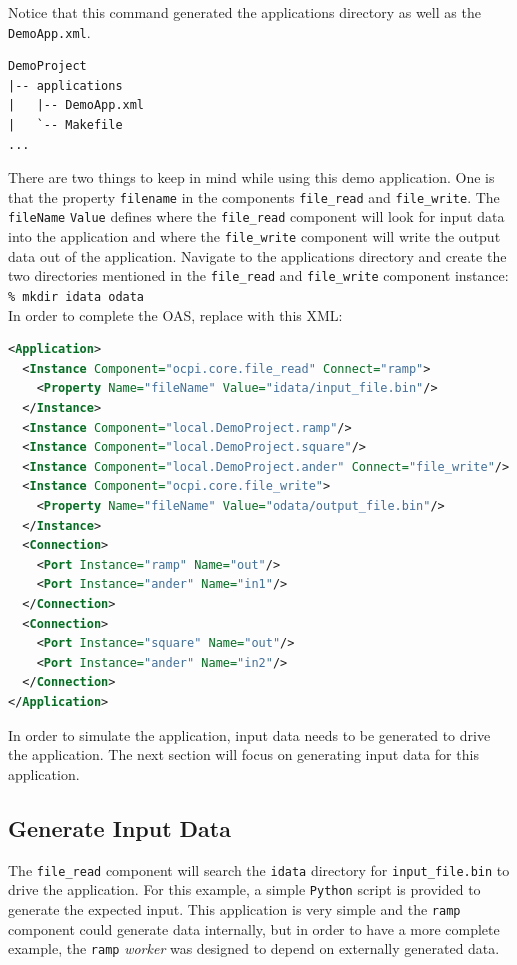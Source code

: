 Notice that this command generated the applications directory as well as the \verb+DemoApp.xml+.

\begin{verbatim}
DemoProject
|-- applications
|   |-- DemoApp.xml
|   `-- Makefile
...
\end{verbatim}

There are two things to keep in mind while using this demo application. One is that the property \verb+filename+ in the components \verb+file_read+ and \verb+file_write+. The \verb+fileName+ \verb+Value+ defines where the \verb+file_read+ component will look for input data into the application and where the \verb+file_write+ component will write the output data out of the application. \newline
\bstart
Navigate to the applications directory and create the two directories mentioned in the \verb+file_read+ and \verb+file_write+ component instance:\\

\forceindent\verb+% mkdir idata odata+\\
\bend
\bstart
\label{example:application}
In order to complete the OAS, replace  with this XML:
\begin{lstlisting}[language=xml]
<Application>
  <Instance Component="ocpi.core.file_read" Connect="ramp">
    <Property Name="fileName" Value="idata/input_file.bin"/>
  </Instance>
  <Instance Component="local.DemoProject.ramp"/>
  <Instance Component="local.DemoProject.square"/>
  <Instance Component="local.DemoProject.ander" Connect="file_write"/>
  <Instance Component="ocpi.core.file_write">
    <Property Name="fileName" Value="odata/output_file.bin"/>
  </Instance>
  <Connection>
    <Port Instance="ramp" Name="out"/>
    <Port Instance="ander" Name="in1"/>
  </Connection>
  <Connection>
    <Port Instance="square" Name="out"/>
    <Port Instance="ander" Name="in2"/>
  </Connection>
</Application>
\end{lstlisting}
\bend

In order to simulate the application, input data needs to be generated to drive the application. The next section will focus on generating input data for this application.

\subsection{Generate Input Data}
The \verb+file_read+ component will search the \verb+idata+ directory for \verb+input_file.bin+ to drive the application. For this example, a simple \verb+Python+ script is provided to generate the expected input. This application is very simple and the \verb+ramp+ component could generate data internally, but in order to have a more complete example, the \verb+ramp+ \textit{worker} was designed to depend on externally generated data. \newline


